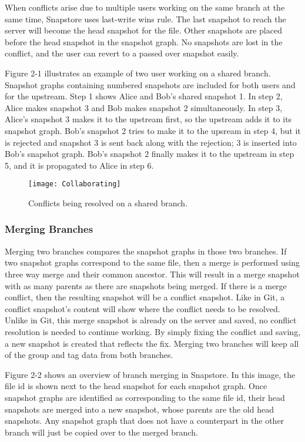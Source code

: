 When conflicts arise due to multiple users working on the same branch at the same time, Snapstore uses last-write wins rule. The last snapshot to reach the server will become the head snapshot for the file. Other snapshots are placed before the head snapshot in the snapshot graph. No snapshots are lost in the conflict, and the user can revert to a passed over snapshot easily.

Figure 2-1 illustrates an example of two user working on a shared branch. Snapshot graphs containing numbered snapshots are included for both users and for the upstream. Step 1 shows Alice and Bob's shared snapshot 1. In step 2, Alice makes snapshot 3 and Bob makes snapshot 2 simultaneously. In step 3, Alice's snapshot 3 makes it to the upstream first, so the upstream adds it to its snapshot graph. Bob's snapshot 2 tries to make it to the upsream in step 4, but it is rejected and snapshot 3 is sent back along with the rejection; 3 is inserted into Bob's snapshot graph. Bob's snapshot 2 finally makes it to the upstream in step 5, and it is propagated to Alice in step 6.

\begin{figure}
\texttt{[image: Collaborating]}
\caption{Conflicts being resolved on a shared branch.}
\label{arm:fig1}
\end{figure}

\subsubsection{Merging Branches}

Merging two branches compares the snapshot graphs in those two branches. If two snapshot graphs correspond to the same file, then a merge is performed using three way merge and their common ancestor. This will result in a merge snapshot with as many parents as there are snapshots being merged. If there is a merge conflict, then the resulting snapshot will be a conflict snapshot. Like in Git, a conflict snapshot's content will show where the conflict needs to be resolved. Unlike in Git, this merge snapshot is already on the server and saved, no conflict resolution is needed to continue working. By simply fixing the conflict and saving, a new snapshot is created that reflects the fix. Merging two branches will keep all of the group and tag data from both branches.

Figure 2-2 shows an overview of branch merging in Snapstore. In this image, the file id is shown next to the head snapshot for each snapshot graph. Once snapshot graphs are identified as corresponding to the same file id, their head snapshots are merged into a new snapshot, whose parents are the old head snapshots. Any snapshot graph that does not have a counterpart in the other branch will just be copied over to the merged branch.

